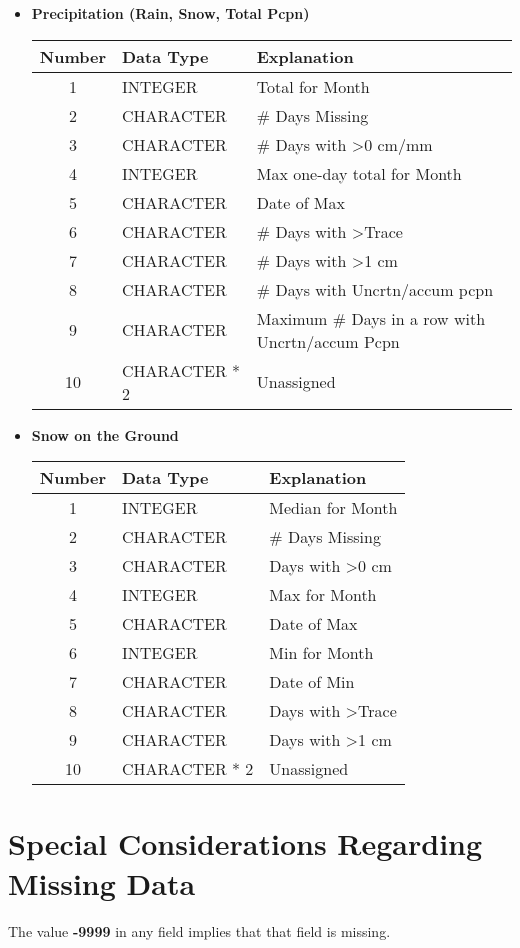 \documentclass[12pt]{article}
\begin{document}
\begin{itemize}
\begin{itemize}
\item \textbf{Precipitation (Rain, Snow, Total Pcpn)} \\
\begin{tabular}{c | l | p{6cm}}
Number & Data Type & Explanation \\
\hline
1 & INTEGER & Total for Month \\
2 & CHARACTER & \# Days Missing \\
3 & CHARACTER & \# Days with \textgreater 0 cm/mm \\
4 & INTEGER & Max one-day total for Month \\
5 & CHARACTER & Date of Max \\
6 & CHARACTER & \# Days with \textgreater Trace \\
7 & CHARACTER & \# Days with \textgreater 1 cm \\
8 & CHARACTER & \# Days with Uncrtn/accum pcpn \\
9 & CHARACTER & Maximum \# Days in a row with Uncrtn/accum Pcpn \\
10 & CHARACTER * 2 & Unassigned
\end{tabular}
\item \textbf{Snow on the Ground} \\
\begin{tabular}{c | l | p{6cm}}
Number & Data Type & Explanation \\
\hline
1 & INTEGER & Median for Month \\
2 & CHARACTER & \# Days Missing \\
3 & CHARACTER & Days with \textgreater 0 cm \\
4 & INTEGER & Max for Month \\
5 & CHARACTER & Date of Max \\
6 & INTEGER & Min for Month \\
7 & CHARACTER & Date of Min \\
8 & CHARACTER & Days with \textgreater Trace \\
9 & CHARACTER & Days with \textgreater 1 cm \\
10 & CHARACTER * 2 & Unassigned
\end{tabular}
\end{itemize}
\end{itemize}

\section{Special Considerations Regarding Missing Data}
\label{sec:missing}
The value \textbf{-9999} in any field implies that that field is missing.
\end{document}
